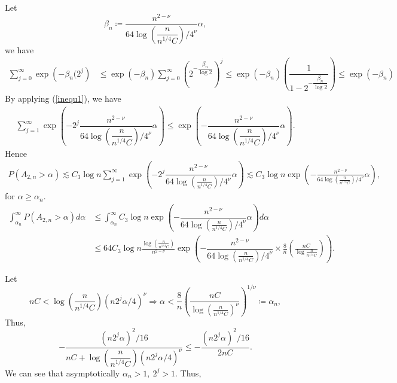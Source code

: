 \documentclass[10pt,twoside]{article}
\numberwithin{equation}{section}
\begin{document}
% 
%
Let 
%
\[ \beta_n \coloneqq \dfrac{n^ {2-\nu}}{64 \log \left( \dfrac{n}{n^ {1/4} 
 C} \right)/4^ {\nu}} \alpha,   \]
 we have 
%
\begin{align}\label{inequ1}
   \sum_{j=0}^ {\infty} \exp\left(- \beta_n (2^j \right) &  \leq \exp\left(-\beta_n \right) \sum_{j=0}^ {\infty} \left(2^{ -\dfrac{\beta_n }{\log 2}} \right)^j  \leq \exp\left(- \beta_n \right) \left(\dfrac{1}{1 - 2^ {- \dfrac{\beta_n }{\log 2}}} \right)  \leq  \exp\left(-\beta_n \right)
\end{align}
%
By applying   (\ref{inequ1}),  we have 
%
\begin{align}
\sum_{j=1}^ {\infty} \exp\left( -2^j \dfrac{n^ {2-\nu}}{64 \log(\dfrac{n}{n^ {1/4}  C})/4^ {\nu}} \alpha \right)  \leq  \exp\left( - \dfrac{n^{2-\nu}}{64 \log(\dfrac{n}{n^ {1/4}  C})/4^ {\nu}} \alpha \right).
\end{align}
%
Hence 
%
\begin{align}
 P(A_ {2, n} > \alpha) \lesssim C_3 \log n \sum_{j=1}^ {\infty}  \exp\left(- 2^j \dfrac{n^ {2-\nu}}{64 \log(\frac{n}{n^ {1/4}  C})/4^ {\nu}} \alpha \right) \lesssim  C_3 \log n \exp\left(- \frac{n^ {2-\nu}}{64 \log(\frac{n}{n^ {1/4} C})/4^\nu} \alpha \right),
\end{align}
%
for $\alpha \ge \alpha_n$.
%
\begin{align}
\int_{\alpha_n}^ {\infty}  P(A_ {2, n} > \alpha) d \alpha
\nonumber & \leq \int_ {\alpha_n}^ {\infty}  C_3 \log n \exp\left(- \dfrac{n^{2-\nu}}{64 \log(\frac{n}{n^ {1/4}  C})/4^ {\nu}} \alpha \right) d \alpha 
\\
\nonumber & \leq 64 C_3 \log n \frac{\log(\frac{n}{n^ {1/4} C})}{n^ {2-\nu}} \exp\left(- \dfrac{n^ {2-\nu}}{64 \log(\frac{n}{n^ {1/4} C})/4^ {\nu}} \times \frac{8}{n} \left(\frac{n C}{\log \frac{n}{n^ {1/4} C}} \right) \right).
\end{align}
%

\medskip

Let 
%
\begin{equation}
 n  C < \log(\dfrac{n}{n^ {1/4} C})(n 2^j \alpha/4)^ {\nu} \Longrightarrow   \alpha <  \frac{8}{n}\left(\frac{n C}{\log(\frac{n}{n^ {1/4}C})^{\nu}}\right)^ {1/\nu} \coloneqq \alpha_{n},
\end{equation}
%
%
Thus,
%
\[ -\dfrac{(n 2^j \alpha)^2 /16}{n C  + \log(\dfrac{n}{n^ {1/4} C})(n 2^j \alpha/4)^ {\nu}} \leq -\frac{(n 2^j \alpha)^2 /16}{2n C}.   \]
%
We can see that  asymptotically $\alpha_n > 1, ~ 2^j > 1$.
%
Thus, 

\medskip
\end{document}
